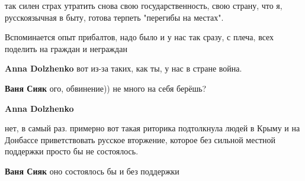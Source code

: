 \begin{itemize}
 

так силен страх утратить снова свою государственность, свою страну, что я,
русскоязычная в быту, готова терпеть "перегибы на местах". 

Вспоминается опыт
прибалтов, надо было и у нас так сразу, с плеча, всех поделить на граждан и
неграждан

\begin{itemize}
 
\textbf{Anna Dolzhenko} вот из-за таких, как ты, у нас в стране война.

 
\textbf{Ваня Сияк} ого, обвинение)) не много на себя берёшь?

 
\textbf{Anna Dolzhenko} 

нет, в самый раз. примерно вот такая риторика подтолкнула людей в Крыму и на
Донбассе приветствовать русское вторжение, которое без сильной местной
поддержки просто бы не состоялось.


 
\textbf{Ваня Сияк} оно состоялось бы и без поддержки

 

\end{itemize}
\end{itemize}
